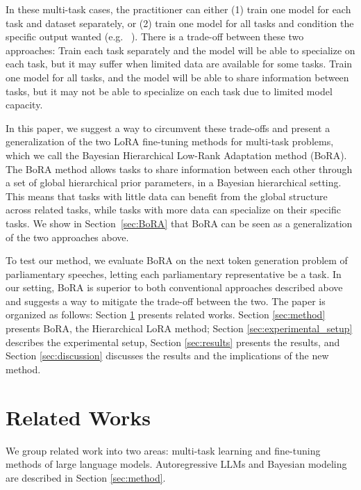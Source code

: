 \documentclass[fullpaper]{nldl}
\begin{document}
In these multi-task cases, the practitioner can either (1) train one model for each task and dataset separately, or (2) train one model for all tasks and condition the specific output wanted (e.g. ~\cite{Raffel2019}).
There is a trade-off between these two approaches: Train each task separately and the model will be able to specialize on each task, but it may suffer when limited data are available for some tasks. Train one model for all tasks, and the model will be able to share information between tasks, but it may not be able to specialize on each task due to limited model capacity.

In this paper, we suggest a way to circumvent these trade-offs and present a generalization of the two LoRA fine-tuning methods for multi-task problems, which we call the Bayesian Hierarchical Low-Rank Adaptation method (BoRA).
The BoRA method allows tasks to share information between each other through a set of global hierarchical prior parameters, in a Bayesian hierarchical setting. 
This means that tasks with little data can benefit from the global structure across related tasks, while tasks with more data can specialize on their specific tasks.
We show in Section~\ref{sec:BoRA} that BoRA can be seen as a generalization of the two approaches above.

To test our method, we evaluate BoRA on the next token generation problem of parliamentary speeches, letting each parliamentary representative be a task. In our setting, BoRA is superior to both conventional approaches described above and suggests a way to mitigate the trade-off between the two.
The paper is organized as follows: Section \ref{sec:related_works} presents related works. Section \ref{sec:method} presents BoRA, the Hierarchical LoRA method; Section \ref{sec:experimental_setup} describes the experimental setup, Section \ref{sec:results} presents the results, and Section \ref{sec:discussion} discusses the results and the implications of the new method.



\section{Related Works} \label{sec:related_works}
We group related work into two areas: multi-task learning and fine-tuning methods of large language models. Autoregressive LLMs and Bayesian modeling are described in Section \ref{sec:method}.
\end{document}
